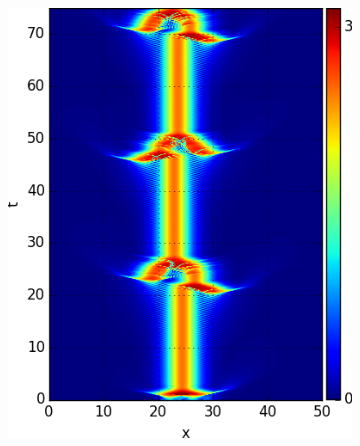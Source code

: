 \documentclass[mathserif, handout]{beamer}
\begin{document}
\begin{frame}[allowframebreaks]
  \begin{figure}[h]
  \centering
  \begin{subfigure}{.23\linewidth}
    \centering
    \captionsetup{justification=centering}
    \caption{}
    \includegraphics[width=\textwidth]{cqcglStateSpaceReflectT75h005}
    \label{}
  \end{subfigure}
  \begin{subfigure}{.23\linewidth}
    \centering
    \captionsetup{justification=centering}
    \caption{}

\end{subfigure}
\end{figure}
\end{frame}
\end{document}
